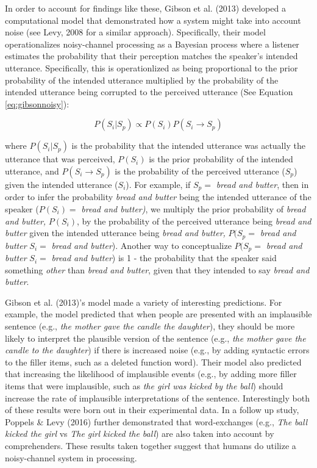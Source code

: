\documentclass[10pt, letterpaper]{article}
\begin{document}
In order to account for findings like these, Gibson et al. (2013)
developed a computational model that demonstrated how a system might
take into account noise (see Levy, 2008 for a similar approach).
Specifically, their model operationalizes noisy-channel processing as a
Bayesian process where a listener estimates the probability that their
perception matches the speaker's intended utterance. Specifically, this
is operationlized as being proportional to the prior probability of the
intended utterance multiplied by the probability of the intended
utterance being corrupted to the perceived utterance (See Equation
\ref{eq:gibsonnoisy}):

\begin{equation}
\label{eq:gibsonnoisy}
P(S_i|S_p) \propto P(S_i) P(S_i \to S_p)
\end{equation}

\noindent where \(P(S_i|S_p)\) is the probability that the intended
utterance was actually the utterance that was perceived, \(P(S_i)\) is
the prior probability of the intended utterance, and \(P(S_i \to S_p)\)
is the probability of the perceived utterance (\(S_p\)) given the
intended utterance (\(S_i\)). For example, if \(S_p =\) \emph{bread and
butter}, then in order to infer the probability \emph{bread and butter}
being the intended utterance of the speaker (\(P(S_i)=\) \emph{bread and
butter)}, we multiply the prior probability of \emph{bread and butter,}
\(P(S_i)\), by the probability of the perceived utterance being
\emph{bread and butter} given the intended utterance being \emph{bread
and butter,} \(P(S_p =\) \emph{bread and butter} \textbar{} \(S_i=\)
\emph{bread and butter}). Another way to conceptualize \(P(S_p =\)
\emph{bread and butter} \textbar{} \(S_i=\) \emph{bread and butter}) is
1 - the probability that the speaker said something \emph{other} than
\emph{bread and butter}, given that they intended to say \emph{bread and
butter}.

Gibson et al. (2013)'s model made a variety of interesting predictions.
For example, the model predicted that when people are presented with an
implausible sentence (e.g., \emph{the mother gave the candle the
daughter}), they should be more likely to interpret the plausible
version of the sentence (e.g., \emph{the mother gave the candle to the
daughter}) if there is increased noise (e.g., by adding syntactic errors
to the filler items, such as a deleted function word). Their model also
predicted that increasing the likelihood of implausible events (e.g., by
adding more filler items that were implausible, such as \emph{the girl
was kicked by the ball}) should increase the rate of implausible
interpretations of the sentence. Interestingly both of these results
were born out in their experimental data. In a follow up study, Poppels
\& Levy (2016) further demonstrated that word-exchanges (e.g., \emph{The
ball kicked the girl} vs \emph{The girl kicked the ball}) are also taken
into account by comprehenders. These results taken together suggest that
humans do utilize a noisy-channel system in processing.
\end{document}
